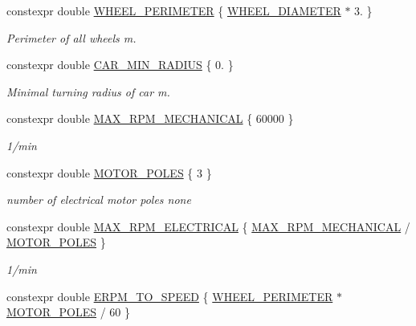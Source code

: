 \begin{DoxyCompactItemize}
constexpr double \hyperlink{namespacecar__config_a46fe00906da07d2e030b586a634cd907}{W\+H\+E\+E\+L\+\_\+\+P\+E\+R\+I\+M\+E\+T\+ER} \{ \hyperlink{namespacecar__config_a6f064e331d6d85d46028dfbe75f063dd}{W\+H\+E\+E\+L\+\_\+\+D\+I\+A\+M\+E\+T\+ER} $\ast$ 3. \}
\begin{DoxyCompactList}\small\item\em Perimeter of all wheels  m. \end{DoxyCompactList}\item 
constexpr double \hyperlink{namespacecar__config_a15ef5c54eaa890e38deadf5b4243cfb5}{C\+A\+R\+\_\+\+M\+I\+N\+\_\+\+R\+A\+D\+I\+US} \{ 0. \}
\begin{DoxyCompactList}\small\item\em Minimal turning radius of car  m. \end{DoxyCompactList}\item 
constexpr double \hyperlink{namespacecar__config_ad35069a183782259c6280aa219b72ffa}{M\+A\+X\+\_\+\+R\+P\+M\+\_\+\+M\+E\+C\+H\+A\+N\+I\+C\+AL} \{ 60000 \}
\begin{DoxyCompactList}\small\item\em 1/min \end{DoxyCompactList}\item 
constexpr double \hyperlink{namespacecar__config_a611a0f02cf52db1d438a2dd53b642cd5}{M\+O\+T\+O\+R\+\_\+\+P\+O\+L\+ES} \{ 3 \}
\begin{DoxyCompactList}\small\item\em number of electrical motor poles  none \end{DoxyCompactList}\item 
constexpr double \hyperlink{namespacecar__config_aaf4d6a90e2b9c983b0b0d29a584c399b}{M\+A\+X\+\_\+\+R\+P\+M\+\_\+\+E\+L\+E\+C\+T\+R\+I\+C\+AL} \{ \hyperlink{namespacecar__config_ad35069a183782259c6280aa219b72ffa}{M\+A\+X\+\_\+\+R\+P\+M\+\_\+\+M\+E\+C\+H\+A\+N\+I\+C\+AL} / \hyperlink{namespacecar__config_a611a0f02cf52db1d438a2dd53b642cd5}{M\+O\+T\+O\+R\+\_\+\+P\+O\+L\+ES} \}
\begin{DoxyCompactList}\small\item\em 1/min \end{DoxyCompactList}\item 
constexpr double \hyperlink{namespacecar__config_af33b95798967e7193927782fd91d36ce}{E\+R\+P\+M\+\_\+\+T\+O\+\_\+\+S\+P\+E\+ED} \{ \hyperlink{namespacecar__config_a46fe00906da07d2e030b586a634cd907}{W\+H\+E\+E\+L\+\_\+\+P\+E\+R\+I\+M\+E\+T\+ER} $\ast$ \hyperlink{namespacecar__config_a611a0f02cf52db1d438a2dd53b642cd5}{M\+O\+T\+O\+R\+\_\+\+P\+O\+L\+ES} / 60 \}

\end{DoxyCompactItemize}

